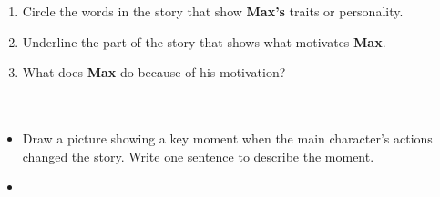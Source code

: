 \documentclass[12pt]{article}
\begin{document}
\vspace{1em}



\begin{tcolorbox}[colframe=black!60, colback=white, 
coltitle=black, colbacktitle=black!15, fonttitle=\bfseries\Large, 
title=Independent Practice, halign title=center, left=10pt, right=10pt, top=10pt, bottom=15pt]
\begin{enumerate}[itemsep=3em]
    \item Circle the words in the story that show \textbf{Max's} traits or personality.
    \item Underline the part of the story that shows what motivates \textbf{Max}.
    \item What does \textbf{Max} do because of his motivation?
    \\[0.8cm] \underline{\hspace{14cm}}  
    \\[0.8cm] \underline{\hspace{14cm}}  
    \\[0.8cm] \underline{\hspace{14cm}} 
\end{enumerate}
\end{tcolorbox}

\vspace{1em}

\begin{tcolorbox}[colframe=black!60, colback=white, 
coltitle=black, colbacktitle=black!15, fonttitle=\bfseries\Large, 
title=Exit Ticket, halign title=center, left=10pt, right=10pt, top=10pt, bottom=15pt]
\begin{itemize}
    \item Draw a picture showing a key moment when the main character’s actions changed the story. Write one sentence to describe the moment.
    \item \vspace{10cm}
\end{itemize}
\end{tcolorbox}
\end{document}
